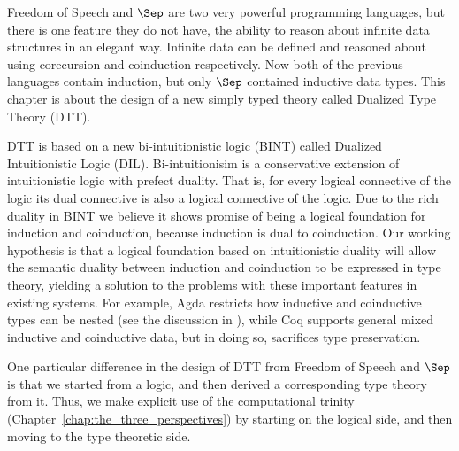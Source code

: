 \newcommand{\redtoby}[1]{\stackrel{ \ifrName{({\tiny #1})}}{\redto}}



\newcommand{\ifrName}[1]{\textsc{#1}}

\newcommand{\ndto}[1]{\to_{#1}}
\newcommand{\ndwedge}[1]{\wedge_{#1}}

\newcommand{\To}[0]{\Rightarrow}
\newcommand{\SN}[0]{\mathbf{SN}} 

Freedom of Speech and $\Sep$ are two very powerful programming
languages, but there is one feature they do not have, the ability to
reason about infinite data structures
in an elegant way.  Infinite data can be defined and reasoned about
using corecursion and coinduction respectively.
Now both of the previous languages contain induction, but only $\Sep$
contained inductive data types.  This chapter is about the design of a
new simply typed theory called Dualized Type Theory (DTT).

DTT is based on a new bi-intuitionistic logic
(BINT) called Dualized
Intuitionistic Logic (DIL).  Bi-intuitionisim is a conservative
extension of intuitionistic logic with prefect duality.  That is, for
every logical connective of the logic its dual connective is also a
logical connective of the logic.  Due to the rich duality in BINT we
believe it shows promise of being a logical foundation for induction
and coinduction, because induction is dual to coinduction. Our working
hypothesis is that a logical foundation based on intuitionistic
duality will allow the semantic duality between induction and
coinduction to be expressed in type theory, yielding a solution to the
problems with these important features in existing systems.  For
example, Agda restricts how inductive and coinductive types can be
nested (see the discussion in \cite{abel+13}), while Coq supports
general mixed inductive and coinductive data, but in doing so,
sacrifices type preservation.

One particular difference in the design of DTT from Freedom of Speech
and $\Sep$ is that we started from a logic, and then derived a
corresponding type theory from it.  Thus, we make explicit use of the
computational trinity (Chapter~\ref{chap:the_three_perspectives}) by
starting on the logical side, and then moving to the type theoretic
side.

